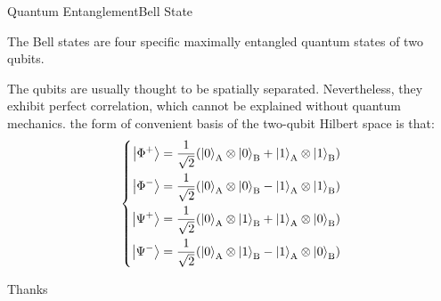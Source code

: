 \documentclass[beamer,serif]{beamer}
\begin{document}
\begin{frame}{Quantum Entanglement}{Bell State}
	\par The Bell states are four specific maximally entangled quantum states of two qubits.
	\par The qubits are usually thought to be spatially separated. Nevertheless, they exhibit perfect correlation, which cannot be explained without quantum mechanics. the form of convenient basis of the two-qubit Hilbert space is that:
\begin{equation}
	\left\{
		\begin{aligned}
			\left|\Phi^{+}\right\rangle & = \dfrac{1}{\sqrt{2}}(\left|0\right\rangle_{\rm{A}}\otimes\left|0\right\rangle_{\rm{B}}+\left|1\right\rangle_{\rm{A}}\otimes\left|1\right\rangle_{\rm{B}})	 \\
			\left|\Phi^{-}\right\rangle & = \dfrac{1}{\sqrt{2}}(\left|0\right\rangle_{\rm{A}}\otimes\left|0\right\rangle_{\rm{B}}-\left|1\right\rangle_{\rm{A}}\otimes\left|1\right\rangle_{\rm{B}})	 \\
			\left|\Psi^{+}\right\rangle & = \dfrac{1}{\sqrt{2}}(\left|0\right\rangle_{\rm{A}}\otimes\left|1\right\rangle_{\rm{B}}+\left|1\right\rangle_{\rm{A}}\otimes\left|0\right\rangle_{\rm{B}})	 \\
			\left|\Psi^{-}\right\rangle & = \dfrac{1}{\sqrt{2}}(\left|0\right\rangle_{\rm{A}}\otimes\left|1\right\rangle_{\rm{B}}-\left|1\right\rangle_{\rm{A}}\otimes\left|0\right\rangle_{\rm{B}})	 \\
		\end{aligned}
	\right.
\end {equation}	
\end{frame}

\begin{frame}{}{}
	\par Thanks
\end{frame}
\end{document}
